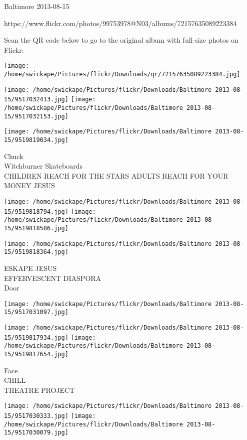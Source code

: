 \documentclass[10pt,letterpaper]{article}
\begin{document}
Baltimore 2013-08-15

https://www.flickr.com/photos/99753978@N03/albums/72157635089223384

Scan the QR code below to go to the original album with full-size photos on Flickr:

\texttt{[image: /home/swickape/Pictures/flickr/Downloads/qr/72157635089223384.jpg]}
\pagebreak

\texttt{[image: /home/swickape/Pictures/flickr/Downloads/Baltimore 2013-08-15/9517032413.jpg]}
\texttt{[image: /home/swickape/Pictures/flickr/Downloads/Baltimore 2013-08-15/9517032153.jpg]}

\vspace{0.25in}
\texttt{[image: /home/swickape/Pictures/flickr/Downloads/Baltimore 2013-08-15/9519819034.jpg]}

Chuck\\
Witchburner Skateboards\\
CHILDREN REACH FOR THE STARS ADULTS REACH FOR YOUR MONEY JESUS\\
\pagebreak

\texttt{[image: /home/swickape/Pictures/flickr/Downloads/Baltimore 2013-08-15/9519818794.jpg]}
\texttt{[image: /home/swickape/Pictures/flickr/Downloads/Baltimore 2013-08-15/9519818586.jpg]}

\texttt{[image: /home/swickape/Pictures/flickr/Downloads/Baltimore 2013-08-15/9519818364.jpg]}

ESKAPE JESUS\\
EFFERVESCENT DIASPORA\\
Door\\
\pagebreak

\texttt{[image: /home/swickape/Pictures/flickr/Downloads/Baltimore 2013-08-15/9517031097.jpg]}

\vspace{0.25in}
\texttt{[image: /home/swickape/Pictures/flickr/Downloads/Baltimore 2013-08-15/9519817934.jpg]}
\texttt{[image: /home/swickape/Pictures/flickr/Downloads/Baltimore 2013-08-15/9519817654.jpg]}

Face\\
CHILL\\
THEATRE PROJECT\\
\pagebreak

\texttt{[image: /home/swickape/Pictures/flickr/Downloads/Baltimore 2013-08-15/9517030333.jpg]}
\texttt{[image: /home/swickape/Pictures/flickr/Downloads/Baltimore 2013-08-15/9517030079.jpg]}
\end{document}
